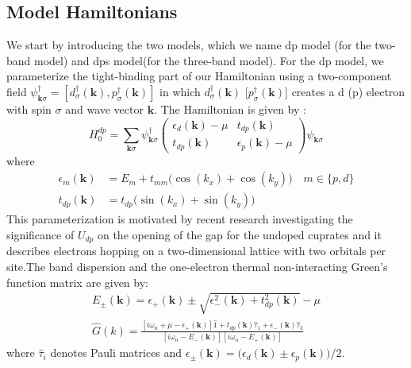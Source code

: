 \documentclass[10pt]{ruthesis}
\begin{document}
{\subsection{Model Hamiltonians}
We start by introducing the two models, which we name dp model (for the two-band model) and dps model(for the three-band model). For the dp model, we parameterize the  tight-binding part of our Hamiltonian using a two-component field $\psi^\dagger_{\mathbf k\sigma}=[d^\dagger_\sigma(\mathbf k),p^\dagger_\sigma(\mathbf k)]$ in which $d^\dagger_\sigma(\mathbf k)$ [$p^\dagger_\sigma(\mathbf k)$] creates a d (p) electron with spin $\sigma$ and wave vector $\mathbf k$. The Hamiltonian is given by : 
\begin{equation}
H^{dp}_0=\sum_{\mathbf{k} \sigma}\psi_{\mathbf k\sigma}^\dagger
 \left(
 \begin{array}{cc}
 \epsilon_d(\mathbf k)-\mu&t_{dp}(\mathbf k)\\
t_{dp}(\mathbf k)&\epsilon_p(\mathbf k)-\mu
 \end{array}
 \right)
\psi_{\mathbf k \sigma}
\end{equation}
where 
\begin{align*}
\epsilon_{m}(\mathbf k)    & =E_m+t_{mm}\big(\cos(k_x)+\cos(k_y)\big)\quad m\in\{p,d\}\\ 
t_{dp}(\mathbf k) & =t_{dp}\big(\sin(k_x)+\sin(k_y)\big) 
\end{align*}
This parameterization is motivated by recent research \cite{NJOP_Udp_in_cuprates_2014_K.Held} investigating the significance of $U_{dp}$ on the opening of the gap for the undoped cuprates and it describes electrons hopping on a two-dimensional lattice with two orbitals per site.The band dispersion and the one-electron thermal non-interacting Green's function matrix are given by:
\begin{align}
E_{\pm}(\mathbf k)=\epsilon_{+}(\mathbf k)\pm\sqrt{\epsilon^2_-(\mathbf k)+t^2_{dp}(\mathbf k)}-\mu\\
\hat G(k)=\frac{[i\omega_n+\mu-\epsilon_+(\mathbf k)]\hat 1+t_{dp}(\mathbf k)\hat \tau_1+\epsilon_-(\mathbf k)\hat \tau_3}{[i\omega_n-E_-(\mathbf k)][i\omega_n-E_+(\mathbf k)]}
\end{align}
where $\hat \tau_i$ denotes Pauli matrices and $\epsilon_{\pm}(\mathbf k) =\big(\epsilon_d(\mathbf k)\pm\epsilon_p(\mathbf k)\big)/2$. 

}
\end{document}
